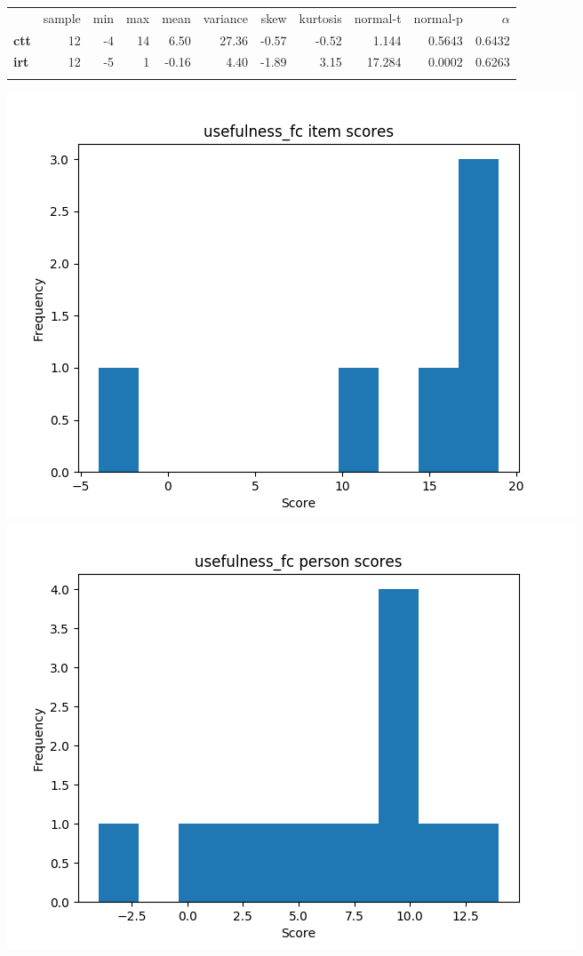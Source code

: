 \documentclass[]{article}
\begin{document}
\begin{longtable}[c]{@{}lrrrrrrrrrr@{}}
\toprule\addlinespace
& sample & min & max & mean & variance & skew & kurtosis & normal-t &
normal-p & $\alpha$
\\\addlinespace
\midrule\endhead
\textbf{ctt} & 12 & -4 & 14 & 6.50 & 27.36 & -0.57 & -0.52 & 1.144 &
0.5643 & 0.6432
\\\addlinespace
\textbf{irt} & 12 & -5 & 1 & -0.16 & 4.40 & -1.89 & 3.15 & 17.284 &
0.0002 & 0.6263
\\\addlinespace
\bottomrule
\end{longtable}

\includegraphics{usefulness_fc_diff.png}
\includegraphics{usefulness_fc_abil.png}
\end{document}
